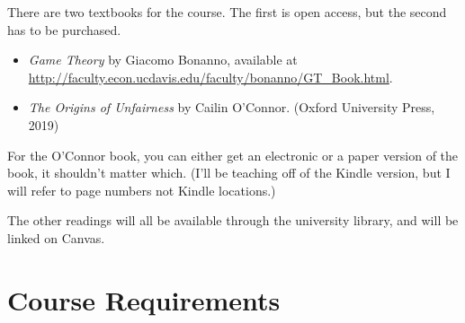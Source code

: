 \documentclass[
]{article}
\providecommand{\tightlist}{%
  \setlength{\itemsep}{0pt}\setlength{\parskip}{0pt}}
\begin{document}
There are two textbooks for the course. The first is open access, but
the second has to be purchased.

\begin{itemize}
\tightlist
\item
  \emph{Game Theory} by Giacomo Bonanno, available at
  \url{http://faculty.econ.ucdavis.edu/faculty/bonanno/GT_Book.html}.
\item
  \emph{The Origins of Unfairness} by Cailin O'Connor. (Oxford
  University Press, 2019)
\end{itemize}

For the O'Connor book, you can either get an electronic or a paper
version of the book, it shouldn't matter which. (I'll be teaching off of
the Kindle version, but I will refer to page numbers not Kindle
locations.)

The other readings will all be available through the university library,
and will be linked on Canvas.

\hypertarget{course-requirements}{%
\section{Course Requirements}\label{course-requirements}}
\end{document}
